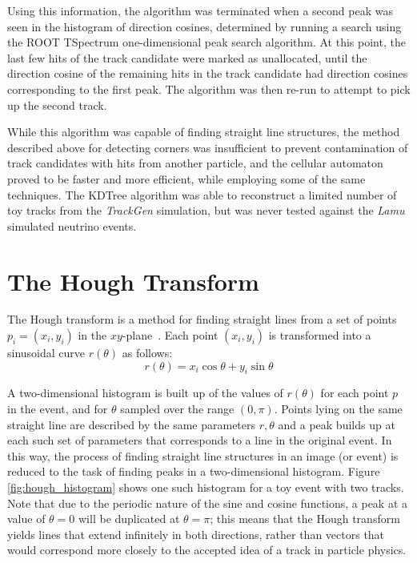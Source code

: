 Using this information, the algorithm was terminated when a second peak was seen in the histogram of direction cosines, determined by running a search using the ROOT TSpectrum one-dimensional peak search algorithm. At this point, the last few hits of the track candidate were marked as unallocated, until the direction cosine of the remaining hits in the track candidate had direction cosines corresponding to the first peak. The algorithm was then re-run to attempt to pick up the second track.

While this algorithm was capable of finding straight line structures, the method described above for detecting corners was insufficient to prevent contamination of track candidates with hits from another particle, and the cellular automaton proved to be faster and more efficient, while employing some of the same techniques. The KDTree algorithm was able to reconstruct a limited number of toy tracks from the \emph{TrackGen} simulation, but was never tested against the \emph{Lamu} simulated neutrino events.

\section{The Hough Transform}
The Hough transform is a method for finding straight lines from a set of points $p_i = (x_i, y_i)$ in the $xy$-plane~\citep{Hough1959}. Each point $(x_i, y_i)$ is transformed into a sinusoidal curve $r(\theta)$ as follows:
\begin{equation}
    r(\theta) = x_i \cos \theta + y_i \sin \theta
\end{equation}

A two-dimensional histogram is built up of the values of $r(\theta)$ for each point $p$ in the event, and for $\theta$ sampled over the range $(0,\pi)$. Points lying on the same straight line are described by the same parameters $r,\theta$ and a peak builds up at each such set of parameters that corresponds to a line in the original event. In this way, the process of finding straight line structures in an image (or event) is reduced to the task of finding peaks in a two-dimensional histogram. Figure \ref{fig:hough_histogram} shows one such histogram for a toy event with two tracks. Note that due to the periodic nature of the sine and cosine functions, a peak at a value of $\theta=0$ will be duplicated at $\theta=\pi$; this means that the Hough transform yields lines that extend infinitely in both directions, rather than vectors that would correspond more closely to the accepted idea of a track in particle physics.

